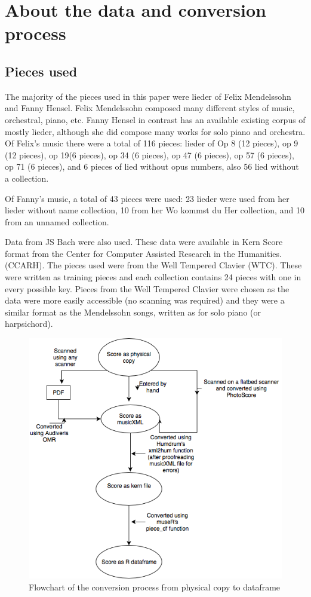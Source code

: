 \documentclass[12pt,twoside]{reedthesis}
\theoremstyle{definition}
\theoremstyle{definition}
\theoremstyle{definition}
\theoremstyle{remark}
\begin{document}
\chapter{About the data and conversion
process}\label{about-the-data-and-conversion-process}

\section{Pieces used}\label{pieces-used}

The majority of the pieces used in this paper were lieder of Felix
Mendelssohn and Fanny Hensel. Felix Mendelssohn composed many different
styles of music, orchestral, piano, etc. Fanny Hensel in contrast has an
available existing corpus of mostly lieder, although she did compose
many works for solo piano and orchestra. Of Felix's music there were a
total of 116 pieces: lieder of Op 8 (12 pieces), op 9 (12 pieces), op
19(6 pieces), op 34 (6 pieces), op 47 (6 pieces), op 57 (6 pieces), op
71 (6 pieces), and 6 pieces of lied without opus numbers, also 56 lied
without a collection.

Of Fanny's music, a total of 43 pieces were used: 23 lieder were used
from her lieder without name collection, 10 from her Wo kommst du Her
collection, and 10 from an unnamed collection.

Data from JS Bach were also used. These data were available in Kern
Score format from the Center for Computer Assisted Research in the
Humanities. (CCARH). The pieces used were from the Well Tempered Clavier
(WTC). These were written as training pieces and each collection
contains 24 pieces with one in every possible key. Pieces from the Well
Tempered Clavier were chosen as the data were more easily accessible (no
scanning was required) and they were a similar format as the Mendelssohn
songs, written as for solo piano (or harpsichord).
\begin{figure}[h]
\centering
\includegraphics[scale = .5]{images/test.png}
\caption{Flowchart of the conversion process from physical copy to dataframe}
\label{subd}
\end{figure}
\end{document}
